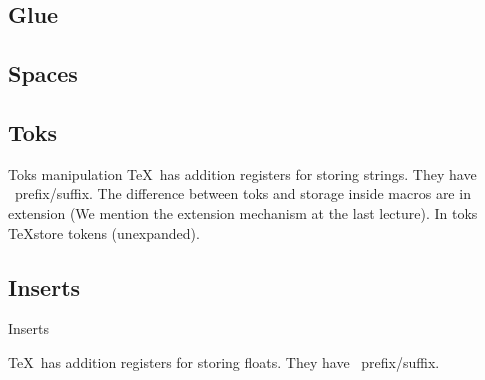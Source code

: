 \subsection{Glue}

\subsection{Spaces}

\subsection{Toks}
\begin{frame}{Toks manipulation\tW\magicPage}\relax
    \TeX\ has addition registers for storing strings. They have \ccol\toks\ prefix/suffix. The difference between toks and storage inside macros are in extension (We mention the extension mechanism at the last lecture). In toks \TeX store tokens (unexpanded).
     
\end{frame}
\subsection{Inserts}
\begin{frame}{Inserts\tW\magicPage}\relax

    \TeX\ has addition registers for storing floats. They have \ccol\insert\ prefix/suffix. 
     
\end{frame}


